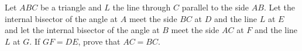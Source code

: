 Let $ABC$ be a triangle and $L$ the line through $C$ parallel to the side $AB$. Let the internal bisector of the angle at $A$ meet the side $BC$ at $D$ and the line $L$ at $E$ and let the internal bisector of the angle at $B$ meet the side $AC$ at $F$ and the line $L$ at $G$. If $GF = DE$, prove that $AC = BC$.
